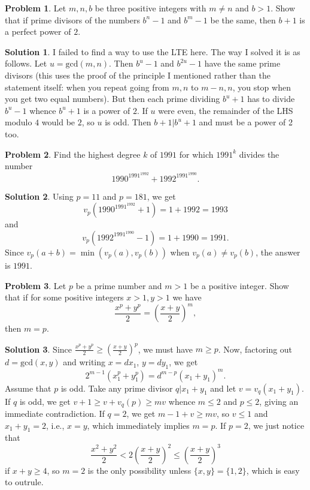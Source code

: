 \documentclass{article}
\theoremstyle{definition}
\newtheorem{problem}{Problem}
\newtheorem*{solution}{Solution}
\begin{document}
\begin{problem}
Let $m,n,b$ be three positive integers with $m \neq n$ and $b>1.$ Show that if prime divisors of the numbers $b^n-1$ and $b^m-1$ be the same, then $b+1$ is a perfect power of $2.$
\end{problem}

\begin{solution}
I failed to find a way to use the LTE here. The way I solved it is as follows. Let $u=\text{gcd}(m,n)$. Then $b^u-1$ and $b^{2u}-1$ have the same prime divisors (this uses the proof of the principle I mentioned rather than the statement itself: when you repeat going from $m,n$ to $m-n,n$, you stop when you get two equal numbers).
But then each prime dividing $b^u+1$ has to divide $b^u-1$ whence $b^u+1$ is a power of $2$. If $u$ were even, the remainder of the LHS modulo $4$ would be $2$, so $u$ is odd. Then $b+1|b^u+1$ and must be a power of 2 too.
\end{solution}

\begin{problem}
Find the highest degree $ k$ of $ 1991$ for which $ 1991^k$ divides the number $$1990^{1991^{1992}} + 1992^{1991^{1990}}.$$
\end{problem}

\begin{solution}
Using $p=11$ and $p=181$, we get $$v_p(1990^{1991^{1992}}+1)=1+1992=1993$$ and $$v_p(1992^{1991^{1990}}-1)=1+1990=1991.$$ Since $v_p(a+b)=\min(v_p(a),v_p(b))$ when $v_p(a)\ne v_p(b)$, the answer is $1991$.
\end{solution}

\begin{problem}
Let $p$ be a prime number and $m>1$ be a positive integer. Show that if for some positive integers $x>1, y>1$ we have
$$\frac{x^p+y^p}{2}= \left( \frac{x+y}{2} \right)^m,$$
then $m=p.$
\end{problem}

\begin{solution}
Since $\frac{x^p+y^p}2\ge \left(\frac{x+y}2\right)^p$, we must have $m\ge p$. Now, factoring out $d=\text{gcd}(x,y)$ and writing $x=dx_1$, $y=dy_1$, we get $$2^{m-1}(x_1^p+y_1^p)=d^{m-p}(x_1+y_1)^m.$$
Assume that $p$ is odd. Take any prime divisor $q|x_1+y_1$ and let $v=v_q(x_1+y_1)$. If $q$ is odd, we get $v+1\ge v+v_q(p)\ge mv$ whence $m\le 2$ and $p\le 2$, giving an immediate contradiction. If $q=2$, we get $m-1+v\ge mv$, so $v\le 1$ and $x_1+y_1=2$, i.e., $x=y$, which immediately implies $m=p$.
If $p=2$, we just notice that $$\frac{x^2+y^2}2< 2\left(\frac{x+y}2\right)^2\le \left(\frac{x+y}2\right)^3$$ if $x+y\ge 4$, so $m=2$ is the only possibility unless $\{x,y\}=\{1,2\}$, which is easy to outrule.
\end{solution}
\end{document}
